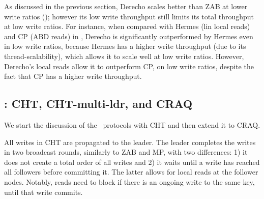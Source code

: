 As discussed in the previous section, Derecho scales better than ZAB at lower write ratios (); however its low write throughput still limits its total throughput at low write ratios.
For instance, when compared with Hermes (lin local reads) and CP (ABD reads) in , Derecho is significantly outperformed by Hermes even in low write ratios, because Hermes has a higher write throughput (due to its thread-scalability), which allows it to scale well at low write ratios. 
However, Derecho's local reads allow it to outperform CP, on low write ratios, despite the fact that CP has a higher write throughput.



\subsection{\LPKO: CHT, CHT-multi-ldr, and CRAQ}\label{sec:ev:lpko}

We start the discussion of the \LPKO~protocols with CHT and then extend it to CRAQ. 


All writes in CHT are propagated to the leader. The leader completes the writes in two broadcast rounds, similarly to ZAB and MP, with two differences: 1) it does not create a total order of all writes and 2) it waits until a write has reached all followers before committing it. 
The latter allows for local reads at the follower nodes. Notably, reads need to block if there is an ongoing write to the same key, until that write commits. %


